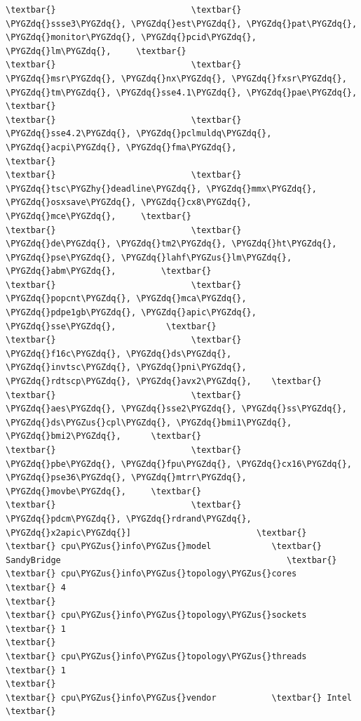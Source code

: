 \documentclass[letterpaper,10pt,english]{sphinxmanual}
\def\PYGZus{\char`\_}
\def\PYGZhy{\char`\-}
\def\PYGZdq{\char`\"}
\begin{document}
\begin{enumerate}
\begin{Verbatim}[commandchars=\\\{\}]
\textbar{}                           \textbar{}     \PYGZdq{}ssse3\PYGZdq{}, \PYGZdq{}est\PYGZdq{}, \PYGZdq{}pat\PYGZdq{}, \PYGZdq{}monitor\PYGZdq{}, \PYGZdq{}pcid\PYGZdq{}, \PYGZdq{}lm\PYGZdq{},     \textbar{}
\textbar{}                           \textbar{}     \PYGZdq{}msr\PYGZdq{}, \PYGZdq{}nx\PYGZdq{}, \PYGZdq{}fxsr\PYGZdq{}, \PYGZdq{}tm\PYGZdq{}, \PYGZdq{}sse4.1\PYGZdq{}, \PYGZdq{}pae\PYGZdq{},         \textbar{}
\textbar{}                           \textbar{}     \PYGZdq{}sse4.2\PYGZdq{}, \PYGZdq{}pclmuldq\PYGZdq{}, \PYGZdq{}acpi\PYGZdq{}, \PYGZdq{}fma\PYGZdq{},                \textbar{}
\textbar{}                           \textbar{}     \PYGZdq{}tsc\PYGZhy{}deadline\PYGZdq{}, \PYGZdq{}mmx\PYGZdq{}, \PYGZdq{}osxsave\PYGZdq{}, \PYGZdq{}cx8\PYGZdq{}, \PYGZdq{}mce\PYGZdq{},     \textbar{}
\textbar{}                           \textbar{}     \PYGZdq{}de\PYGZdq{}, \PYGZdq{}tm2\PYGZdq{}, \PYGZdq{}ht\PYGZdq{}, \PYGZdq{}pse\PYGZdq{}, \PYGZdq{}lahf\PYGZus{}lm\PYGZdq{}, \PYGZdq{}abm\PYGZdq{},         \textbar{}
\textbar{}                           \textbar{}     \PYGZdq{}popcnt\PYGZdq{}, \PYGZdq{}mca\PYGZdq{}, \PYGZdq{}pdpe1gb\PYGZdq{}, \PYGZdq{}apic\PYGZdq{}, \PYGZdq{}sse\PYGZdq{},          \textbar{}
\textbar{}                           \textbar{}     \PYGZdq{}f16c\PYGZdq{}, \PYGZdq{}ds\PYGZdq{}, \PYGZdq{}invtsc\PYGZdq{}, \PYGZdq{}pni\PYGZdq{}, \PYGZdq{}rdtscp\PYGZdq{}, \PYGZdq{}avx2\PYGZdq{},    \textbar{}
\textbar{}                           \textbar{}     \PYGZdq{}aes\PYGZdq{}, \PYGZdq{}sse2\PYGZdq{}, \PYGZdq{}ss\PYGZdq{}, \PYGZdq{}ds\PYGZus{}cpl\PYGZdq{}, \PYGZdq{}bmi1\PYGZdq{}, \PYGZdq{}bmi2\PYGZdq{},      \textbar{}
\textbar{}                           \textbar{}     \PYGZdq{}pbe\PYGZdq{}, \PYGZdq{}fpu\PYGZdq{}, \PYGZdq{}cx16\PYGZdq{}, \PYGZdq{}pse36\PYGZdq{}, \PYGZdq{}mtrr\PYGZdq{}, \PYGZdq{}movbe\PYGZdq{},     \textbar{}
\textbar{}                           \textbar{}     \PYGZdq{}pdcm\PYGZdq{}, \PYGZdq{}rdrand\PYGZdq{}, \PYGZdq{}x2apic\PYGZdq{}]                         \textbar{}
\textbar{} cpu\PYGZus{}info\PYGZus{}model            \textbar{} SandyBridge                                             \textbar{}
\textbar{} cpu\PYGZus{}info\PYGZus{}topology\PYGZus{}cores   \textbar{} 4                                                       \textbar{}
\textbar{} cpu\PYGZus{}info\PYGZus{}topology\PYGZus{}sockets \textbar{} 1                                                       \textbar{}
\textbar{} cpu\PYGZus{}info\PYGZus{}topology\PYGZus{}threads \textbar{} 1                                                       \textbar{}
\textbar{} cpu\PYGZus{}info\PYGZus{}vendor           \textbar{} Intel                                                   \textbar{}

\end{Verbatim}
\end{enumerate}
\end{document}

